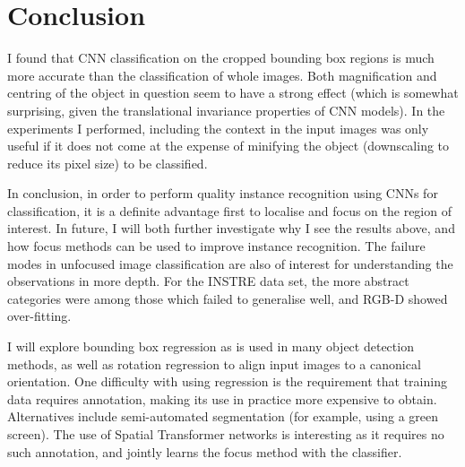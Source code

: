 \section{Conclusion}

I found that CNN classification on the cropped bounding box regions is much more accurate than the classification of whole images. Both magnification and centring of the object in question seem to have a strong effect (which is somewhat surprising, given the translational invariance properties of CNN models). In the experiments I performed, including the context in the input images was only useful if it does not come at the expense of minifying the object (downscaling to reduce its pixel size) to be classified.

In conclusion, in order to perform quality instance recognition using \gls{CNN}s for classification, it is a definite advantage first to localise and focus on the region of interest.  In future, I will both further investigate why I see the results above, and how focus methods can be used to improve instance recognition. The failure modes in unfocused image classification are also of interest for understanding the observations in more depth. For the INSTRE data set, the more abstract categories were among those which failed to generalise well, and RGB-D showed over-fitting.

I will explore bounding box regression as is used in many object detection methods, as well as rotation regression to align input images to a canonical orientation. One difficulty with using regression is the requirement that training data requires annotation, making its use in practice more expensive to obtain. Alternatives include semi-automated segmentation (for example, using a green screen). The use of Spatial Transformer networks is interesting as it requires no such annotation, and jointly learns the focus method with the classifier.




